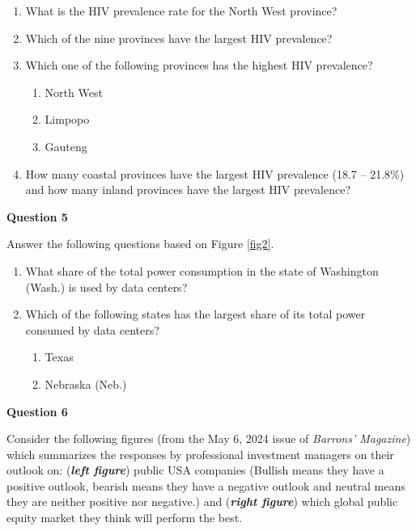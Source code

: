 \documentclass[
]{book}
\begin{document}
\begin{enumerate}
\def\labelenumi{\alph{enumi}.}
\item
  What is the HIV prevalence rate for the North West province?
\item
  Which of the nine provinces have the largest HIV prevalence?
\item
  Which one of the following provinces has the highest HIV prevalence?

  \begin{enumerate}
  \def\labelenumii{\roman{enumii}.}
  \item
    North West
  \item
    Limpopo
  \item
    Gauteng
  \end{enumerate}
\item
  How many coastal provinces have the largest HIV prevalence (18.7 -- 21.8\%) and how many inland provinces have the largest HIV prevalence?
\end{enumerate}

\textbf{Question 5}

Answer the following questions based on Figure \ref{fig2}.

\begin{enumerate}
\def\labelenumi{\alph{enumi}.}
\item
  What share of the total power consumption in the state of Washington (Wash.) is used by data centers?
\item
  Which of the following states has the largest share of its total power consumed by data centers?

  \begin{enumerate}
  \def\labelenumii{\roman{enumii}.}
  \item
    Texas
  \item
    Nebraska (Neb.)
  \end{enumerate}
\end{enumerate}

\textbf{Question 6}

Consider the following figures (from the May 6, 2024 issue of \emph{Barrons' Magazine}) which summarizes the responses by professional investment managers on their outlook on: (\textbf{\emph{left figure}}) public USA companies (Bullish means they have a positive outlook, bearish means they have a negative outlook and neutral means they are neither positive nor negative.) and (\textbf{\emph{right figure}}) which global public equity market they think will perform the best.
\end{document}
